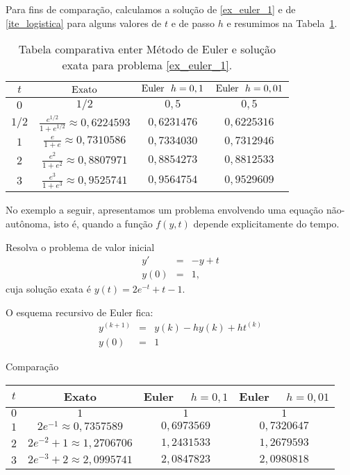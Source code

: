 Para fins de comparação, calculamos a solução de \ref{ex_euler_1} e de \eqref{ite_logistica} para alguns valores de $t$ e de passo $h$ e resumimos na Tabela~\ref{tab:log}.

\begin{table}
  \caption{Tabela comparativa enter Método de Euler e solução exata para problema \ref{ex_euler_1}.}
  \label{tab:log}
  \begin{tabular}{|c|c|c|c|}\hline
    $t$ & $\hbox{Exato}$ & $\hbox{Euler}~~ h=0,1$ & $\hbox{Euler}~~ h=0,01$\\\hline
    $0$ & $1/2$ & $0,5$ & $0,5$\\\hline
    $1/2$ & $\frac{e^{1/2}}{1+e^{1/2}}\approx 0,6224593$ & $0,6231476$ & $0,6225316$\\\hline
    $1$ & $\frac{e}{1+e}\approx 0,7310586$ & $0,7334030$ & $0,7312946$\\\hline
    $2$ & $\frac{e^2}{1+e^2}\approx  0,8807971$ & $0,8854273$  & $0,8812533$ \\\hline
    $3$ & $\frac{e^3}{1+e^3}\approx   0,9525741$  & $0,9564754$ & $0,9529609$ \\\hline
  \end{tabular}
\end{table}


No exemplo a seguir, apresentamos um problema envolvendo uma equação não-autônoma, isto é, quando a função $f(y,t)$ depende explicitamente do tempo.

\begin{ex} Resolva o problema de valor inicial
  \begin{eqnarray*}
    y'&=&-y+t\\
    y(0)&=&1,
  \end{eqnarray*}
cuja solução exata é $y(t)=2e^{-t}+t-1$.
\end{ex}
O esquema recursivo de Euler fica:
\begin{eqnarray*}
  y^{(k+1)}&=&y({k})- hy({k})+ht^{(k)}\\
  y(0)&=&1
\end{eqnarray*}

Comparação
\begin{center}
\begin{tabular}{|c|c|c|c|}\hline
$t$ &  Exato & Euler~~ $h=0,1$ & Euler~~ $h=0,01$\\\hline
$0$ &  $1$ & $1$ & $1$\\\hline
$1$ &   $2e^{-1}\approx 0,7357589$ & $0,6973569$   &   $0,7320647$  \\\hline
$2$ &   $2e^{-2}+1\approx  1,2706706$ & $ 1,2431533 $   &  $ 1,2679593$     \\\hline
$3$ &   $2e^{-3}+2\approx 2,0995741$  & $ 2,0847823$ & $2,0980818$   \\\hline
\end{tabular}    
\end{center}

